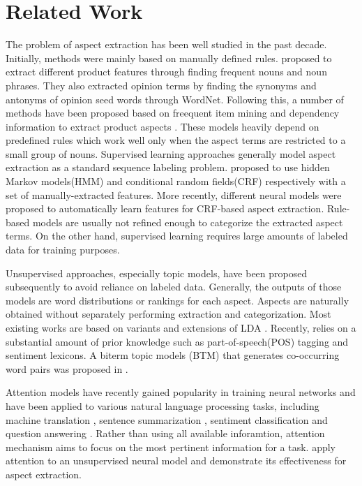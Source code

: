 \documentclass{article}
\begin{document}
\section{Related Work}
\label{sec:related}
The problem of aspect extraction has been well studied in the past decade. Initially, methods were mainly based on manually defined rules. \cite{HuLiu2004} proposed to extract different product features through finding frequent nouns and noun phrases. They also extracted opinion terms by finding the synonyms and antonyms of opinion seed words through WordNet. Following this, a number of methods have been proposed based on freequent item mining and dependency information to extract product aspects \cite{Zhuang2006} \cite{Somasundarn2009} \cite{Qiu2011}. These models heavily depend on predefined rules which work well only when the aspect terms are restricted to a small group of nouns. Supervised learning approaches generally model aspect extraction as a standard sequence labeling problem. \cite{Jin2009} \cite{Li2010} proposed to use hidden Markov models(HMM) and conditional random fields(CRF) respectively with a set of manually-extracted features. More recently, different neural models \cite{Yin2016} \cite{Wang2016} were proposed to automatically learn features for CRF-based aspect extraction. Rule-based models are usually not refined enough to categorize the extracted aspect terms. On the other hand, supervised learning requires large amounts of labeled data for training purposes.

Unsupervised approaches, especially topic models, have been proposed subsequently to avoid reliance on labeled data. Generally, the outputs of those models are word distributions or rankings for each aspect. Aspects are naturally obtained without separately performing extraction and categorization. Most existing works \cite{Brody2010UAS} \cite{Zhao2010JMA} \cite{Mukherjee2012} \cite{Chen2014} are based on variants and extensions of LDA \cite{Blei2003}. Recently, \cite{Wang2015} relies on a substantial amount of prior knowledge such as part-of-speech(POS) tagging and sentiment lexicons. A biterm topic models (BTM) that generates co-occurring word pairs was proposed in \cite{Yan2013}.

Attention models \cite{Mnih2014} have recently gained popularity in training neural networks and have been applied to various natural language processing tasks, including machine translation \cite{Bahdanau2015NMT}, sentence summarization \cite{Rush2015}, sentiment classification \cite{Chen2016} and question answering \cite{Herman2015}. Rather than using all available inforamtion, attention mechanism aims to focus on the most pertinent information for a task. \cite{He2018ABAE} apply attention to an unsupervised neural model and demonstrate its effectiveness for aspect extraction.
\end{document}
